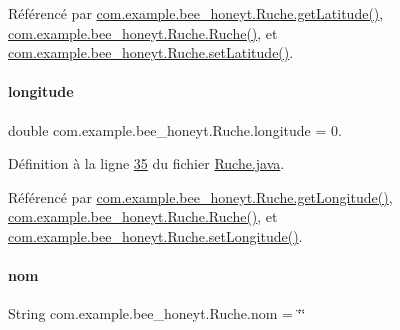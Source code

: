 Référencé par \hyperlink{_ruche_8java_source_l00239}{com.\+example.\+bee\+\_\+honeyt.\+Ruche.\+get\+Latitude()}, \hyperlink{_ruche_8java_source_l00044}{com.\+example.\+bee\+\_\+honeyt.\+Ruche.\+Ruche()}, et \hyperlink{_ruche_8java_source_l00244}{com.\+example.\+bee\+\_\+honeyt.\+Ruche.\+set\+Latitude()}.

\mbox{\label{classcom_1_1example_1_1bee__honeyt_1_1_ruche_aaeb7392ff8f3f26203e23f1dd57ae89f}} 
\paragraph{\texorpdfstring{longitude}{longitude}}
{\footnotesize\ttfamily double com.\+example.\+bee\+\_\+honeyt.\+Ruche.\+longitude = 0.\hspace{0.3cm}{\ttfamily [private]}}



Définition à la ligne \hyperlink{_ruche_8java_source_l00035}{35} du fichier \hyperlink{_ruche_8java_source}{Ruche.\+java}.



Référencé par \hyperlink{_ruche_8java_source_l00229}{com.\+example.\+bee\+\_\+honeyt.\+Ruche.\+get\+Longitude()}, \hyperlink{_ruche_8java_source_l00044}{com.\+example.\+bee\+\_\+honeyt.\+Ruche.\+Ruche()}, et \hyperlink{_ruche_8java_source_l00234}{com.\+example.\+bee\+\_\+honeyt.\+Ruche.\+set\+Longitude()}.

\mbox{\label{classcom_1_1example_1_1bee__honeyt_1_1_ruche_ac72094a8a08cf8f485be1456863bc4bd}} 
\paragraph{\texorpdfstring{nom}{nom}}
{\footnotesize\ttfamily String com.\+example.\+bee\+\_\+honeyt.\+Ruche.\+nom = \char`\"{}\char`\"{}\hspace{0.3cm}{\ttfamily [private]}}



